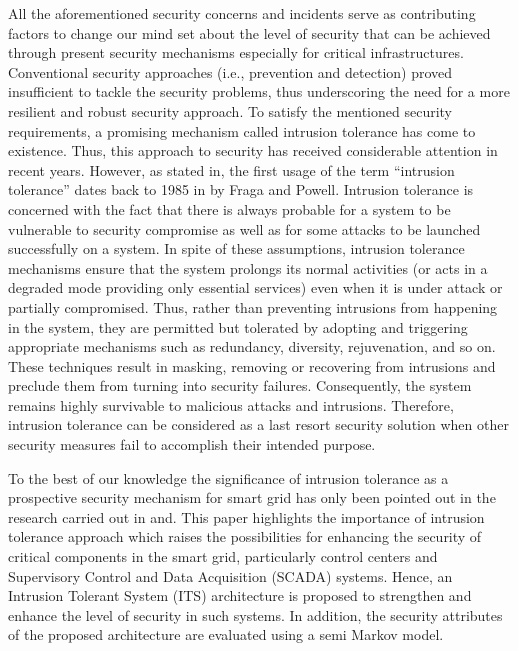 \documentclass[preprint,number,12pt]{elsarticle}
\begin{document}
All the aforementioned security concerns and incidents serve as contributing factors to change our mind set about the level of security that can be achieved through present security mechanisms especially for critical infrastructures. Conventional security approaches (i.e., prevention and detection) proved insufficient to tackle the security problems\citep{Bessani2008c}, thus underscoring the need for a more resilient and robust security approach. To satisfy the mentioned security requirements, a promising mechanism called intrusion tolerance has come to existence. Thus, this approach to security has received considerable attention in recent years\citep{Verissimo2006,Bessani2008c,Nguyen201124,Raj2011,Uemura2010,Bessani2011a,Sousa2010,Deswarte2006432,Nagarajan2010a,Bangalore2009a,Saidane2009a}. However, as stated in\citep{springerlink:10.1007/3-540-45177-3_1}, the first usage of the term “intrusion tolerance” dates back to 1985 in\citep{Fraga1985203} by Fraga and Powell. Intrusion tolerance is concerned with the fact that there is always probable for a system to be vulnerable to security compromise as well as for some attacks to be launched successfully on a system\citep{Verissimo2006}. In spite of these assumptions, intrusion tolerance mechanisms ensure that the system prolongs its normal activities (or acts in a degraded mode providing only essential services) even when it is under attack or partially compromised. Thus, rather than preventing intrusions from happening in the system, they are permitted but tolerated by adopting and triggering appropriate mechanisms such as redundancy, diversity, rejuvenation, and so on. These techniques result in masking, removing or recovering from intrusions and preclude them from turning into security failures\citep{springerlink:10.1007/3-540-45177-3_1}. Consequently, the system remains highly survivable to malicious attacks and intrusions. Therefore, intrusion tolerance can be considered as a last resort security solution when other security measures fail to accomplish their intended purpose.

 To the best of our knowledge the  significance of intrusion tolerance as a prospective security mechanism for smart grid has only been pointed out in the research carried out in\citep{Sridhar2012} and\citep{Overman2011c}. This paper highlights the importance of intrusion tolerance approach which raises the possibilities for enhancing the security of critical components in the smart grid, particularly control centers and Supervisory Control and Data Acquisition (SCADA) systems. Hence, an Intrusion Tolerant System (ITS) architecture is proposed to strengthen and enhance the level of security in such systems. In addition, the security attributes of the proposed architecture are evaluated using a semi Markov model.
\end{document}
